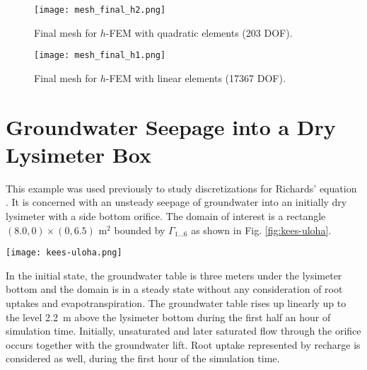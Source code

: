 \documentclass[final,3p,times,twocolumn]{elsarticle}
\begin{document}
\begin{figure}[!ht]
\begin{center}
\texttt{[image: mesh\_final\_h2.png]}
\end{center}
\vspace{-6mm}
\caption{Final mesh for $h$-FEM with quadratic elements (203 DOF).}
\label{fig:final-meshes-2}
\end{figure}

\begin{figure}[!ht]
\begin{center}
\texttt{[image: mesh\_final\_h1.png]}
\end{center}
\vspace{-6mm}
\caption{Final mesh for $h$-FEM with linear elements (17367 DOF).}
\label{fig:final-meshes-3}
\end{figure}





\section{Groundwater Seepage into a Dry Lysimeter Box}
\label{sec:example}

This example was used previously to study discretizations for Richards' equation 
\cite{forsyth,kees}. It is
concerned with an unsteady seepage of groundwater into an initially dry lysimeter with 
a side bottom orifice. The domain of interest is a rectangle $(8.0, 0)  \times (0, 6.5)$ 
m$^2$ bounded by $\Gamma_{1...6}$ as shown in Fig. \ref{fig:kees-uloha}.

\begin{figure*}[!ht]
\begin{center}
 {
\texttt{[image: kees-uloha.png]}
}
\end{center}
\vspace{-6mm}
\caption{Domain geometry for the groundwater seepage problem.}
\label{fig:kees-uloha}
\end{figure*}

In the initial state, the groundwater table is three meters under 
the lysimeter bottom and the domain is in a steady state without any consideration of root 
uptakes and evapotranspiration. The groundwater table rises up linearly up to the level 
2.2~m above the lysimeter bottom during the first half an hour of simulation time. 
Initially, unsaturated and later saturated flow through the orifice occurs together with 
the groundwater lift. Root uptake represented by recharge is considered as well, during 
the first hour of the simulation time. 
\end{document}
